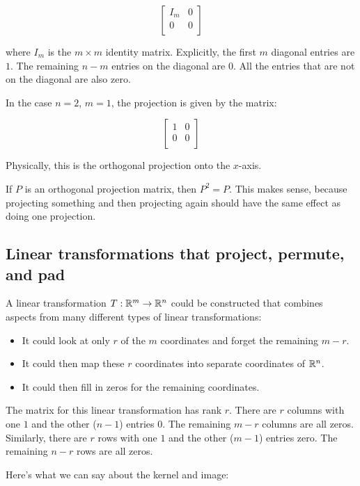 \documentclass[10pt]{amsart}
\begin{document}
$$\left[\begin{matrix} I_m & 0 \\ 0 & 0 \\\end{matrix}\right]$$

where $I_m$ is the $m \times m$ identity matrix. Explicitly, the first
$m$ diagonal entries are $1$. The remaining $n - m$ entries on the
diagonal are $0$. All the entries that are not on the diagonal are
also zero.

In the case $n = 2$, $m = 1$, the projection is given by the matrix:

$$\left[ \begin{matrix} 1 & 0 \\ 0  & 0 \\\end{matrix}\right]$$

Physically, this is the orthogonal projection onto the $x$-axis.

If $P$ is an orthogonal projection matrix, then $P^2 = P$. This makes
sense, because projecting something and then projecting again should
have the same effect as doing one projection.

\subsection{Linear transformations that project, permute, and pad}

A linear transformation $T:\mathbb{R}^m \to \mathbb{R}^n$ could be constructed that
combines aspects from many different types of linear transformations:

\begin{itemize}
\item It could look at only $r$ of the $m$ coordinates and forget the
  remaining $m - r$.
\item It could then map these $r$ coordinates into separate
  coordinates of $\mathbb{R}^n$.
\item It could then fill in zeros for the remaining coordinates.
\end{itemize}

The matrix for this linear transformation has rank $r$. There are $r$
columns with one $1$ and the other ($n - 1$) entries $0$. The
remaining $m - r$ columns are all zeros. Similarly, there are $r$ rows
with one $1$ and the other ($m - 1$) entries zero. The remaining $n -
r$ rows are all zeros.

Here's what we can say about the kernel and image:
\end{document}
